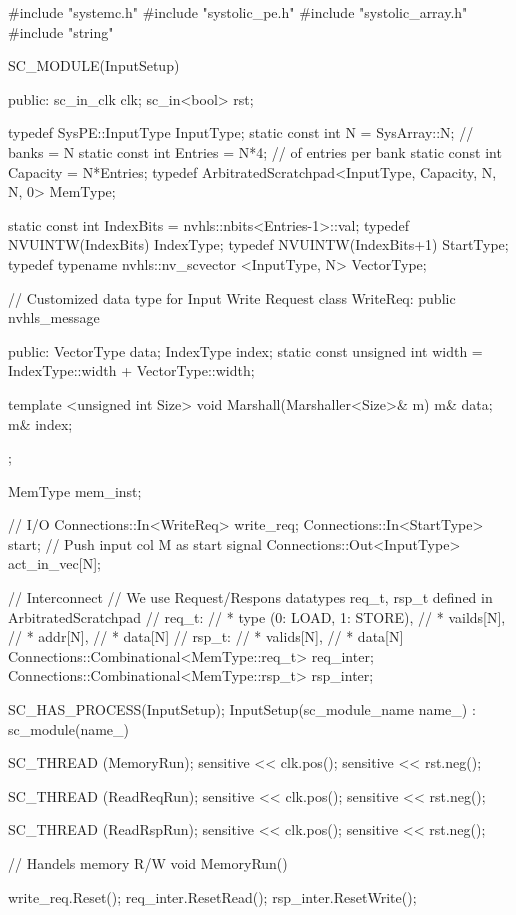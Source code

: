 \begin{codeblock}[language=c++]
#include "systemc.h"
#include "systolic_pe.h"
#include "systolic_array.h"
#include "string"

SC_MODULE(InputSetup)
{
 public: 
  sc_in_clk     clk;
  sc_in<bool>   rst;

  typedef SysPE::InputType InputType;  
  static const int N = SysArray::N;     // banks = N
  static const int Entries = N*4;       // of entries per bank
  static const int Capacity = N*Entries;
  typedef ArbitratedScratchpad<InputType, Capacity, N, N, 0> MemType;

  static const int IndexBits = nvhls::nbits<Entries-1>::val;
  typedef NVUINTW(IndexBits) IndexType;
  typedef NVUINTW(IndexBits+1) StartType;
  typedef typename nvhls::nv_scvector <InputType, N> VectorType;
  
  // Customized data type for Input Write Request 
  class WriteReq: public nvhls_message{
   public:
    VectorType data;
    IndexType index;  
    static const unsigned int width = IndexType::width + VectorType::width;

    template <unsigned int Size>
    void Marshall(Marshaller<Size>& m) {
      m& data;
      m& index;
    }
  };
  
  MemType mem_inst;

  // I/O 
  Connections::In<WriteReq>    write_req;
  Connections::In<StartType>   start; // Push input col M as start signal
  Connections::Out<InputType>  act_in_vec[N];

  // Interconnect
  // We use Request/Respons datatypes req\_t, rsp\_t defined in ArbitratedScratchpad
  // req\_t:
  //   * type (0: LOAD, 1: STORE), 
  //   * vailds[N], 
  //   * addr[N], 
  //   * data[N]
  // rsp\_t: 
  //   * valids[N], 
  //   * data[N]
  Connections::Combinational<MemType::req_t> req_inter;  
  Connections::Combinational<MemType::rsp_t> rsp_inter; 

  SC_HAS_PROCESS(InputSetup);
  InputSetup(sc_module_name name_) : sc_module(name_) {
    SC_THREAD (MemoryRun);
    sensitive << clk.pos();
    sensitive << rst.neg();

    SC_THREAD (ReadReqRun);
    sensitive << clk.pos();
    sensitive << rst.neg();
    
    SC_THREAD (ReadRspRun);
    sensitive << clk.pos();
    sensitive << rst.neg();
  }

  // Handels memory R/W
  void MemoryRun() {
    write_req.Reset();
    req_inter.ResetRead();
    rsp_inter.ResetWrite();

}}
\end{codeblock}
